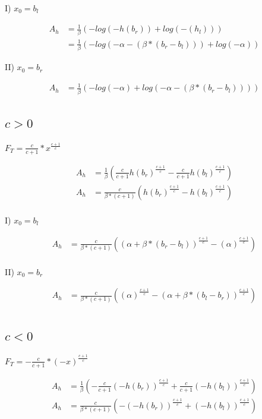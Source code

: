 \documentclass[]{article}
\begin{document}
I) $x_0 = b_l$

\begin{align*}
A_h &= \frac{1}{\beta} \left(-log(-h(b_r)) + log(-(h_l)) \right) \\
&= \frac{1}{\beta} \left(-log(-\alpha - (\beta * (b_r - b_l))) + log(-\alpha) \right)
\end{align*}

II) $x_0 = b_r$

\begin{align*}
A_h &= \frac{1}{\beta} \left(- log(-\alpha) + log(-\alpha - (\beta * (b_r - b_l))) \right)
\end{align*}

\subsection{$c > 0$}

$F_T = \frac{c}{c + 1} * x^{\frac{c + 1}{c}}$

\begin{align*}
A_h &= \frac{1}{\beta} \left( \frac{c}{c + 1} h(b_r)^{\frac{c + 1}{c}} - \frac{c}{c + 1} h(b_l)^{\frac{c + 1}{c}} \right) \\
A_h &= \frac{c}{\beta * (c + 1)}  \left( h(b_r)^{\frac{c + 1}{c}} - h(b_l)^{\frac{c + 1}{c}} \right) \\
\end{align*}

I) $x_0 = b_l$

\begin{align*}
A_h &= \frac{c}{\beta * (c + 1)}  \left( (\alpha + \beta * (b_r - b_l))^{\frac{c + 1}{c}} - (\alpha)^{\frac{c + 1}{c}} \right) \\
\end{align*}

II) $x_0 = b_r$

\begin{align*}
A_h &= \frac{c}{\beta * (c + 1)}  \left( (\alpha)^{\frac{c + 1}{c}} - (\alpha + \beta * (b_l - b_r))^{\frac{c + 1}{c}} \right) \\
\end{align*}

\subsection{$c < 0$}

$F_T = - \frac{c}{c + 1} * (-x)^{\frac{c + 1}{c}}$

\begin{align*}
A_h &= \frac{1}{\beta} \left( - \frac{c}{c + 1} (-h(b_r))^{\frac{c + 1}{c}} + \frac{c}{c + 1} (-h(b_l))^{\frac{c + 1}{c}} \right) \\
A_h &= \frac{c}{\beta * (c + 1)}  \left( - (-h(b_r))^{\frac{c + 1}{c}} + (-h(b_l))^{\frac{c + 1}{c}} \right) \\
\end{align*}
\end{document}
